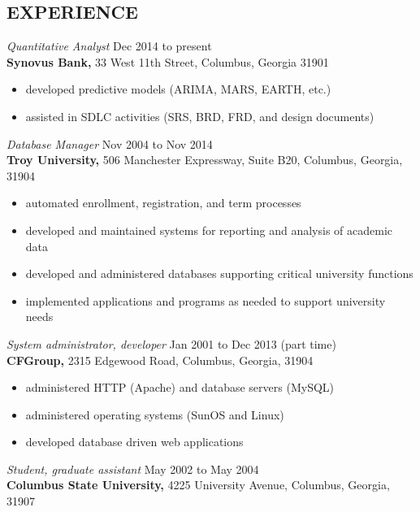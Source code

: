 \documentclass[margin, 11pt]{res} %
\begin{document}
\begin{resume}
\section{EXPERIENCE}

{\it Quantitative Analyst} \hfill Dec 2014 to present \\
\textbf{Synovus Bank,} 33 West 11th Street, Columbus, Georgia 31901

\begin{itemize} \itemsep -2pt %
\item developed predictive models (ARIMA, MARS, EARTH, etc.)
\item assisted in SDLC activities (SRS, BRD, FRD, and design documents)
\end{itemize}
 
{\it Database Manager} \hfill Nov 2004 to Nov 2014 \\
\textbf{Troy University,} 506 Manchester Expressway, Suite B20, Columbus, Georgia, 31904

\begin{itemize} \itemsep -2pt %
\item automated enrollment, registration, and term processes
\item developed and maintained systems for reporting and analysis of academic data
\item developed and administered databases supporting critical university functions 
\item implemented applications and programs as needed to support university needs 
\end{itemize}
 
{\it System administrator, developer} \hfill Jan 2001 to Dec 2013 (part time) \\
\textbf{CFGroup,} 2315 Edgewood Road, Columbus, Georgia, 31904

\begin{itemize} \itemsep -2pt %
\item administered HTTP (Apache) and database servers (MySQL)
\item administered operating systems (SunOS and Linux)
\item developed database driven web applications
\end{itemize}
 
{\it Student, graduate assistant} \hfill May 2002 to May 2004 \\
\textbf{Columbus State University,} 4225 University Avenue, Columbus, Georgia, 31907


\end{resume}
\end{document}

